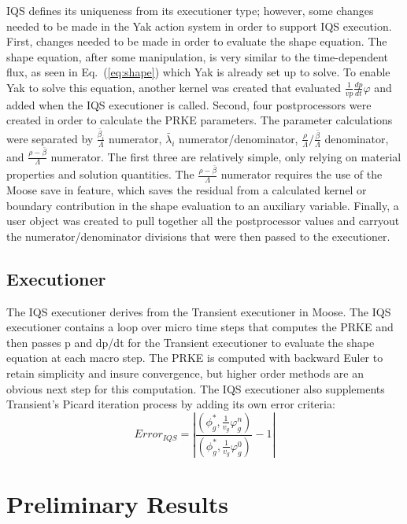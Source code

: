 \documentclass[11pt]{scrartcl}
\newcommand{\eqt}[1]{Eq.~(\ref{#1})}                     %
\newcommand{\be}{\begin{equation}}
\newcommand{\ee}{\end{equation}}
\begin{document}
IQS defines its uniqueness from its executioner type; however, some changes needed to be made in the Yak action system in order to support IQS execution.   First, changes needed to be made in order to evaluate the shape equation.  The shape equation, after some manipulation, is very similar to the time-dependent flux, as seen in \eqt{eq:shape} which Yak is already set up to solve.  To enable Yak to solve this equation, another kernel was created that evaluated $\frac{1}{vp}\frac{dp}{dt}\varphi$ and added when the IQS executioner is called.  Second, four postprocessors were created in order to calculate the PRKE parameters.  The parameter calculations were separated by $\frac{\bar{\beta}_i}{\Lambda}$ numerator, $\bar{\lambda}_i$ numerator/denominator, $\frac{\rho}{\Lambda}/\frac{\bar{\beta}}{\Lambda}$ denominator, and $\frac{\rho-\bar{\beta}}{\Lambda}$ numerator.  The first three are relatively simple, only relying on material properties and solution quantities.  The $\frac{\rho-\bar{\beta}}{\Lambda}$ numerator requires the use of the Moose save in feature, which saves the residual from a calculated kernel or boundary contribution in the shape evaluation to an auxiliary variable.  Finally, a user object was created to pull together all the postprocessor values and carryout the numerator/denominator divisions that were then passed to the executioner.

\subsection{Executioner}

The IQS executioner derives from the Transient executioner in Moose.  The IQS executioner contains a loop over micro time steps that computes the PRKE and then passes p and dp/dt for the Transient executioner to evaluate the shape equation at each macro step.  The PRKE is computed with backward Euler to retain simplicity and insure convergence, but higher order methods are an obvious next step for this computation.   The IQS executioner also supplements Transient’s Picard iteration process by adding its own error criteria: 
\be
Error_{IQS}=\left|\frac{\left(\phi^*_g,\frac{1}{v_g}\varphi_g^n\right)}{\left(\phi_g^*,\frac{1}{v_g}\varphi_g^0\right)}-1\right|
\ee

\section{Preliminary Results}
\end{document}
